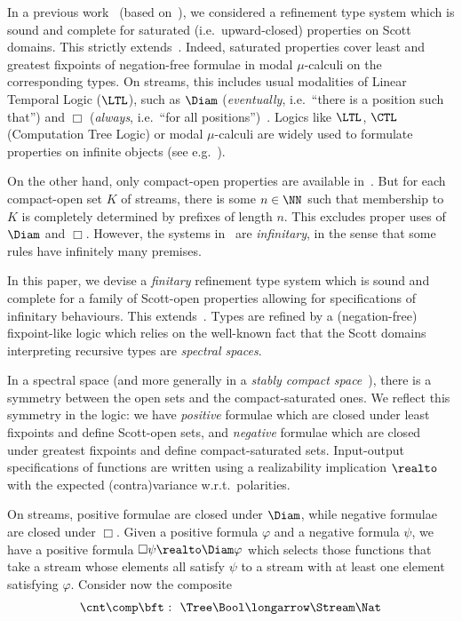 In a previous work~\cite{rk25wollic} (based on~\cite{bk03ic}),
we considered a refinement type system
which is sound and complete for saturated (i.e.\ upward-closed)
properties on Scott domains.
%
This strictly extends~\cite{abramsky87lics,abramsky91apal}.
%
Indeed,
saturated properties cover least and greatest fixpoints of
negation-free formulae in modal $\mu$-calculi on the corresponding types.
On streams, this includes usual modalities of Linear Temporal Logic ($\LTL$),
such as $\Diam$ (\emph{eventually}, i.e.\ ``there is a position such that'')
and $\Box$ (\emph{always}, i.e.\ ``for all positions'')~\cite{rs24jfla}.
%
Logics like $\LTL$, $\CTL$ (Computation Tree Logic) or
modal $\mu$-calculi
are widely used to formulate properties on infinite objects
(see e.g.~\cite{bk08book,hr07chapter,bs07chapter}).

On the other hand, only compact-open properties are available
in~\cite{abramsky87lics,abramsky91apal}.
But for each compact-open set $K$ of streams, there is some $n \in \NN$
such that membership to $K$ is completely determined by prefixes of length $n$.
%
This excludes proper uses of $\Diam$ and $\Box$.
However, the systems in~\cite{bk03ic,rk25wollic} are \emph{infinitary},
in the sense that some rules have infinitely many premises.


In this paper, we devise a \emph{finitary} refinement type system
which is sound and complete for a family of Scott-open properties
allowing for specifications of infinitary behaviours.
This extends~\cite{abramsky87lics,abramsky91apal}.
Types are refined by a (negation-free) fixpoint-like logic which
relies on the well-known fact that the Scott domains interpreting
recursive types are \emph{spectral spaces}. 

In a spectral space
(and more generally in a \emph{stably compact space}~\cite{lawson11mscs}),
there is a symmetry between the open sets and the compact-saturated ones.
We reflect this symmetry in the logic:
we have \emph{positive} formulae
which are closed under least fixpoints and define Scott-open sets,
and \emph{negative} formulae which are closed under greatest fixpoints and define
compact-saturated sets.
%
Input-output specifications of functions are written using a realizability implication
$\realto$
with the expected (contra)variance w.r.t.\ polarities.

On streams, positive formulae are closed under
$\Diam$, while negative formulae are closed under $\Box$.
Given a positive formula $\varphi$ and a negative formula $\psi$,
we have a positive formula $\Box \psi \realto \Diam \varphi$
which selects those functions that take a stream
whose elements all satisfy $\psi$ to a stream with at least one element
satisfying $\varphi$.
%
Consider now the composite
\begin{equation*}
\begin{array}{l @{~} l @{~~} l}
  \cnt \comp \bft
& :
& \Tree \Bool
  \longarrow
  \Stream \Nat
\end{array}
\end{equation*}

